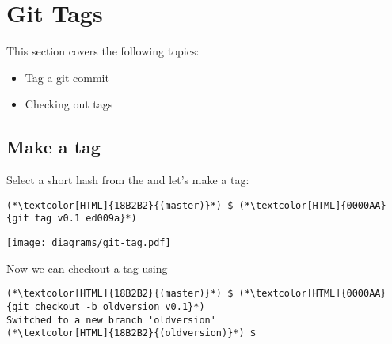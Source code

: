 \section{Git Tags}
\begin{frame}[fragile]
  \slidetitle

  This section covers the following topics:
  \begin{itemize}
    \item Tag a git commit
    \item Checking out tags
  \end{itemize}
\end{frame}

\subsection{Make a tag}
\begin{frame}[fragile]
  \subslidetitle

  Select a short hash from the  and let's make a tag:
  \begin{lstlisting}
(*\textcolor[HTML]{18B2B2}{(master)}*) $ (*\textcolor[HTML]{0000AA}{git tag v0.1 ed009a}*)
\end{lstlisting}
  \centerline{\texttt{[image: diagrams/git-tag.pdf]}}

  \vspace{1em}
  Now we can checkout a tag using 
  \begin{lstlisting}
(*\textcolor[HTML]{18B2B2}{(master)}*) $ (*\textcolor[HTML]{0000AA}{git checkout -b oldversion v0.1}*)
Switched to a new branch 'oldversion'
(*\textcolor[HTML]{18B2B2}{(oldversion)}*) $
\end{lstlisting}

\end{frame}

